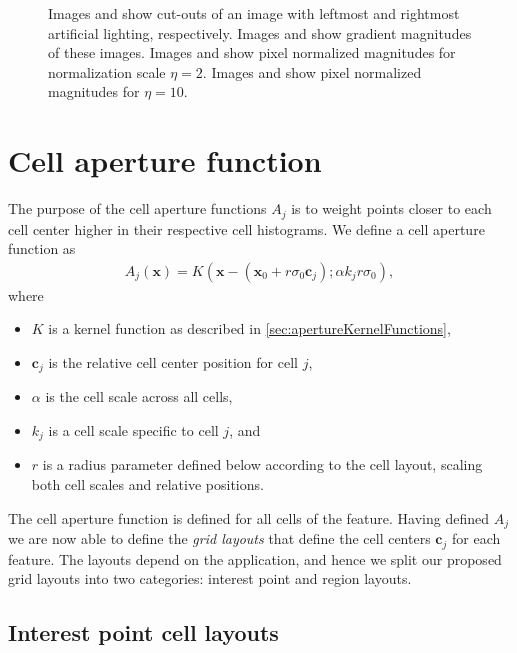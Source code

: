 \documentclass[thesis.tex]{subfiles}
\def\x{\mathbf{x}}
\def\c{\mathbf{c}}
\begin{document}
\begin{figure}[p]
\begin{subfigure}[t]{0.48\textwidth}
        \caption{}
        \label{fig:pixelNormalizationExample8}
    \end{subfigure}
    \caption{Images  and  show cut-outs of an image with leftmost and rightmost artificial lighting, respectively. Images  and  show gradient magnitudes of these images. Images  and  show pixel normalized magnitudes for normalization scale $\eta = 2$. Images  and  show pixel normalized magnitudes for $\eta = 10$.}
    \label{fig:pixelNormalizationExample}
\end{figure}
%
\section{Cell aperture function}
\label{sec:cellApertureFunction}
%
The purpose of the cell aperture functions $A_j$ is to weight points closer to each cell center higher in their respective cell histograms. We define a cell aperture function as
%
\begin{align}
A_j(\x) = K(\x - (\x_0 + r \sigma_0 \c_j); \alpha k_j r \sigma_0),
\end{align}
%
where
%
\begin{itemize}
\item[] $K$ is a kernel function as described in \ref{sec:apertureKernelFunctions},
\item[] $\c_j$ is the relative cell center position for cell $j$,
\item[] $\alpha$ is the cell scale across all cells,
\item[] $k_j$ is a cell scale specific to cell $j$, and
\item[] $r$ is a radius parameter defined below according to the cell layout, scaling both cell scales and relative positions.
\end{itemize}
%
The cell aperture function is defined for all cells of the feature. Having defined $A_j$ we are now able to define the \emph{grid layouts} that define the cell centers $\boldsymbol{c}_j$ for each feature. The layouts depend on the application, and hence we split our proposed grid layouts into two categories: interest point and region layouts.

\subsection{Interest point cell layouts}
\label{sec:cellApertureFunctionPoint}
\end{document}
